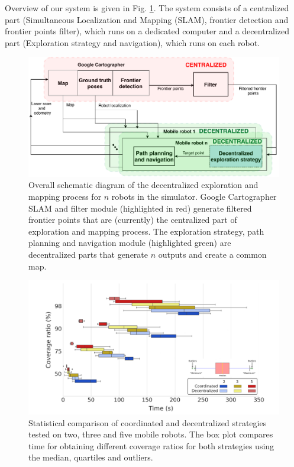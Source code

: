 Overview of our system is given in Fig. \ref{fig:exploration-strategy}. The system consists of a centralized part (Simultaneous Localization and Mapping (SLAM), frontier detection and frontier points filter), which runs on a dedicated computer and a decentralized part (Exploration strategy and navigation), which runs on each robot. 

\begin{figure}[t!]
	\centering\includegraphics[width=1.0\columnwidth]{./pictures/diagram_exploration.pdf}
	\caption{Overall schematic diagram of the decentralized exploration and mapping process for $n$ robots in the simulator. Google Cartographer SLAM and filter module (highlighted in red) generate filtered frontier points that are (currently) the centralized part of exploration and mapping process. The exploration strategy, path planning and navigation module (highlighted green) are decentralized parts that generate $n$ outputs and create a common map.}
	\label{fig:exploration-strategy}
\end{figure}


\begin{figure}[t]
	\centering
	\begin{minipage}{0.95\textwidth}
		\centering
		\includegraphics[width=\columnwidth]{./pictures/results_final.pdf}
	\end{minipage}
	\caption{Statistical comparison of coordinated and decentralized strategies tested on two, three and five mobile robots. The box plot compares time for obtaining different coverage ratios for both strategies using the median, quartiles and outliers.}
	\label{fig:results}
\end{figure}

